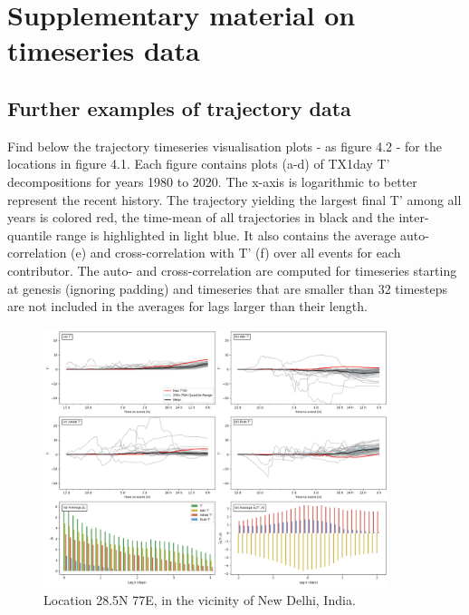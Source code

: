 \chapter{Supplementary material on timeseries data}

\section{Further examples of trajectory data}

Find below the trajectory timeseries visualisation plots - as figure 4.2 - for the locations in figure 4.1. Each figure contains plots (a-d) of TX1day T’ decompositions for years 1980 to 2020. The x-axis is logarithmic to better represent the recent
 history. The trajectory yielding the largest final T’ among all years is colored red, the
 time-mean of all trajectories in black and the inter-quantile range is highlighted in light
 blue. It also contains the average auto-correlation (e) and cross-correlation with T’ (f) over all events
 for each contributor. The auto- and cross-correlation are computed for timeseries starting
 at genesis (ignoring padding) and timeseries that are smaller than 32 timesteps are not
 included in the averages for lags larger than their length.

\begin{figure}[h]
\caption{Location 28.5N 77E, in the vicinity of New Delhi, India.}
\centering
\includegraphics[width=0.9\textwidth]{images/sup1.png}
\end{figure}

